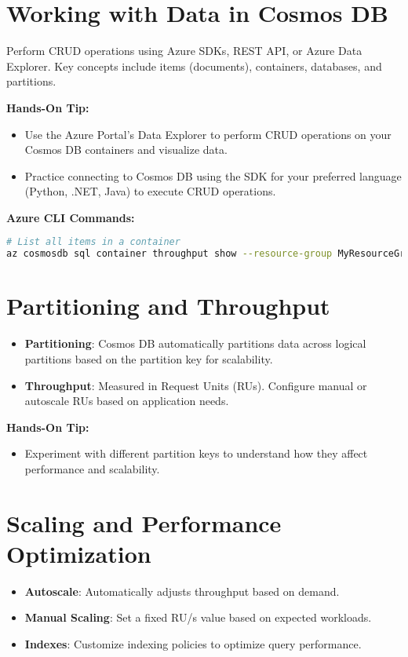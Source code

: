 \documentclass{article}
\begin{document}
\section{Working with Data in Cosmos DB}
Perform CRUD operations using Azure SDKs, REST API, or Azure Data Explorer. Key concepts include items (documents), containers, databases, and partitions.

\textbf{Hands-On Tip:}
\begin{itemize}
    \item Use the Azure Portal's Data Explorer to perform CRUD operations on your Cosmos DB containers and visualize data.
    \item Practice connecting to Cosmos DB using the SDK for your preferred language (Python, .NET, Java) to execute CRUD operations.
\end{itemize}

\textbf{Azure CLI Commands:}
\begin{lstlisting}[language=bash]
# List all items in a container
az cosmosdb sql container throughput show --resource-group MyResourceGroup --account-name mycosmosdbaccount --database-name mydatabase --name mycontainer
\end{lstlisting}

\section{Partitioning and Throughput}
\begin{itemize}
    \item \textbf{Partitioning}: Cosmos DB automatically partitions data across logical partitions based on the partition key for scalability.
    \item \textbf{Throughput}: Measured in Request Units (RUs). Configure manual or autoscale RUs based on application needs.
\end{itemize}

\textbf{Hands-On Tip:}
\begin{itemize}
    \item Experiment with different partition keys to understand how they affect performance and scalability.
\end{itemize}

\section{Scaling and Performance Optimization}
\begin{itemize}
    \item \textbf{Autoscale}: Automatically adjusts throughput based on demand.
    \item \textbf{Manual Scaling}: Set a fixed RU/s value based on expected workloads.
    \item \textbf{Indexes}: Customize indexing policies to optimize query performance.
\end{itemize}
\end{document}
